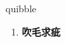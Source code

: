 
\begin{frame}
{\huge quibble}
\begin{center}
\begin{enumerate}\Large
  \item \textbf{吹毛求疵}
\end{enumerate}
\end{center}
\end{frame}
